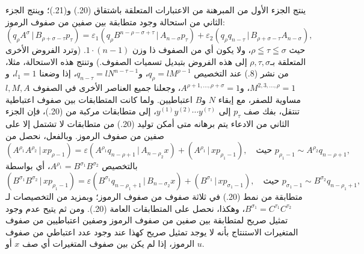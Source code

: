 \documentclass[11pt]{article}
\providecommand{\pair}[2]{(#1\,|\,#2)}
\providecommand{\eps}{\varepsilon}
\begin{document}
ينتج الجزء الأول من المبرهنة من الاعتبارات المتعلقة باشتقاق (20.) و(21.)؛ وينتج الجزء الثاني من استحالة وجود متطابقة بين صفين من صفوف الرموز:
\[
\pair{q_\rho A^\sigma}{B_{\rho+\sigma-\tau}p_\tau}
=\eps_1\pair{q_\rho B^{n-\rho-\sigma+\tau}}{A_{n-\sigma}p_\tau}
+\eps_2\pair{q_\rho q_{n-\tau}}{B_{\rho+\sigma-\tau}A_{n-\sigma}},
\]
حيث $\rho\leqq\tau\leqq\sigma$، ولا يكون أي من الصفوف ذا وزن $1\cdot(n-1)$. (وترد الفروض الأخرى المتعلقة بـ$\rho,\tau,\sigma$ إلى هذه الفروض بتبديل تسميات الصفوف.) وتنتج هذه الاستحالة، مثلا، من نشر (8.) عند التخصيص $q_\rho=lM^{\rho-1}$، و$q_{n-\tau}=lN^{n-\tau-1}$، إذا وضعنا $l_1=1$، و$M^{2,3,\ldots,\rho}=1$، و$A^{\rho+1,\ldots,\rho+\sigma}=1$، وجعلنا جميع العناصر الأخرى في الصفوف $l,M,A$ مساوية للصفر، مع إبقاء $N$ و$B$ اعتباطيين. ولما كانت المتطابقات بين صفوف اعتباطية تنتقل، بفك صف $p_\tau$ إلى $y^{(1)}y^{(2)}\cdots y^{(\tau)}$، إلى متطابقات مركبة من (20.)، فإن الجزء الثاني من الادعاء يتم برهانه متى أمكن توليد (20.) من متطابقات لا تشتمل إلا على صفين من صفوف الرموز. وبالفعل، نحصل من
\begin{equation}
\pair{A^{\rho_1}A^{\rho_2}}{xp_{\rho-1}}
=\eps\pair{A^{\rho_1}q_{n-\rho+1}}{A_{n-\rho_2}x}
+\pair{A^{\rho_1}}{xp_{\rho_1-1}},
\quad \text{حيث }p_{\rho_1-1}\sim A^{\rho_2}q_{n-\rho+1},
\tag{20a}
\end{equation}
بالتخصيص $A^{\rho_1}=B^{\sigma_1}B^{\sigma_2}$، أي بواسطة
\[
\pair{B^{\sigma_1}B^{\sigma_2}}{xp_{\rho_1-1}}
=\eps\pair{B^{\sigma_1}q_{n-\rho_1+1}}{B_{n-\sigma_2}x}
+\pair{B^{\sigma_1}}{xp_{\sigma_1-1}},
\quad \text{حيث } p_{\sigma_1-1}\sim B^{\sigma_2}q_{n-\rho_1+1},
\]
متطابقة من نمط (20.) في ثلاثة صفوف من صفوف الرموز؛ وبمزيد من التخصيصات لـ$B^{\sigma_1}=C^{\tau_1}C^{\tau_2}$، وهكذا، نحصل على المتطابقات العامة (20.). ومن ثم يتيح عدم وجود تمثيل صريح لمتطابقة بين صفين من صفوف الرموز وصفين اعتباطيين من صفوف المتغيرات الاستنتاج بأنه لا يوجد تمثيل صريح كهذا عند وجود عدد اعتباطي من صفوف الرموز، إذا لم يكن بين صفوف المتغيرات أي صف $x$ أو $u$.

\clearpage
\end{document}
